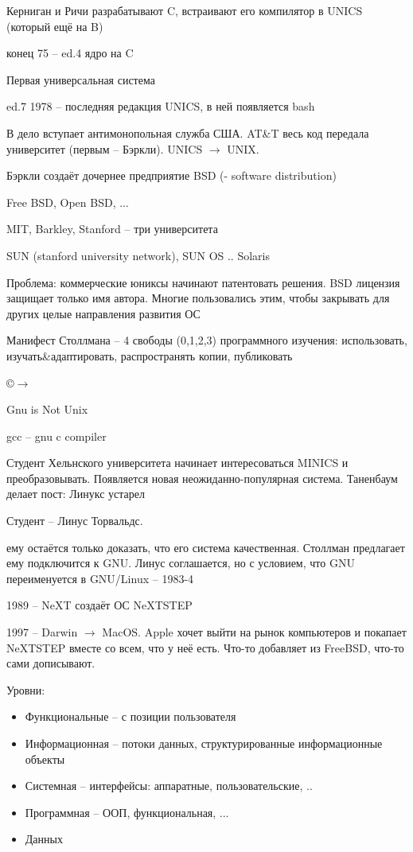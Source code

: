 \documentclass{book}
\theoremstyle{definition}
\begin{document}
    Керниган и Ричи разрабатывают C, встраивают его компилятор в UNICS (который ещё на B)

    конец 75 -- ed.4 ядро на C

    Первая универсальная система

    ed.7 1978 -- последняя редакция UNICS, в ней появляется bash

    В дело вступает антимонопольная служба США. AT\&T весь код передала  университет (первым -- Бэркли). UNICS $\to$ UNIX.

    Бэркли создаёт дочернее предприятие BSD (- software distribution)

    Free BSD, Open BSD, ...

    MIT, Barkley, Stanford -- три университета

    SUN (stanford university network), SUN OS ..  Solaris

    Проблема: коммерческие юниксы начинают патентовать решения. BSD лицензия защищает только имя автора. Многие пользовались этим, чтобы закрывать для других целые направления развития ОС

    Манифест Столлмана -- 4 свободы (0,1,2,3) программного изучения: использовать, изучать\&адаптировать, распространять копии, публиковать

    \copyright $\to $ \textcopyleft

    Gnu is Not Unix

    gcc -- gnu c compiler

    Студент Хельнского университета начинает интересоваться MINICS и преобразовывать. Появляется новая неожиданно-популярная система. Таненбаум делает пост: Линукс устарел

    Студент -- Линус Торвальдс.

    ему остаётся только доказать, что его система качественная. Столлман предлагает ему подключится к GNU. Линус соглашается, но с условием, что GNU переименуется в GNU/Linux -- 1983-4

    1989 -- NeXT создаёт ОС NeXTSTEP

    1997 -- Darwin $\to $ MacOS. Apple хочет выйти на рынок компьютеров и покапает NeXTSTEP вместе со всем, что у неё есть. Что-то добавляет из FreeBSD, что-то сами дописывают.

    Уровни:
    \begin{itemize}
        \item Функциональные -- с позиции пользователя
        \item Информационная -- потоки данных, структурированные информационные объекты
        \item Системная -- интерфейсы: аппаратные, пользовательские, ..
        \item Программная -- ООП, функциональная, ...
        \item Данных
    \end{itemize}
    
\end{document}
